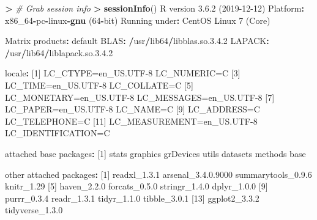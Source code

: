 \documentclass[
]{book}
\newenvironment{Shaded}{\begin{snugshade}}{\end{snugshade}}
\newcommand{\CommentTok}[1]{\textcolor[rgb]{0.56,0.35,0.01}{\textit{#1}}}
\newcommand{\DecValTok}[1]{\textcolor[rgb]{0.00,0.00,0.81}{#1}}
\newcommand{\ErrorTok}[1]{\textcolor[rgb]{0.64,0.00,0.00}{\textbf{#1}}}
\newcommand{\FloatTok}[1]{\textcolor[rgb]{0.00,0.00,0.81}{#1}}
\newcommand{\KeywordTok}[1]{\textcolor[rgb]{0.13,0.29,0.53}{\textbf{#1}}}
\newcommand{\NormalTok}[1]{#1}
\newcommand{\OperatorTok}[1]{\textcolor[rgb]{0.81,0.36,0.00}{\textbf{#1}}}
\newcommand{\StringTok}[1]{\textcolor[rgb]{0.31,0.60,0.02}{#1}}
\begin{document}
\begin{Shaded}
\begin{Highlighting}[]
\OperatorTok{>}\StringTok{ }\CommentTok{# Grab session info}
\ErrorTok{>}\StringTok{ }\KeywordTok{sessionInfo}\NormalTok{()}
\NormalTok{R version }\DecValTok{3}\NormalTok{.}\FloatTok{6.2}\NormalTok{ (}\DecValTok{2019-12-12}\NormalTok{)}
\NormalTok{Platform}\OperatorTok{:}\StringTok{ }\NormalTok{x86_}\DecValTok{64}\OperatorTok{-}\NormalTok{pc}\OperatorTok{-}\NormalTok{linux}\OperatorTok{-}\KeywordTok{gnu}\NormalTok{ (}\DecValTok{64}\OperatorTok{-}\NormalTok{bit)}
\NormalTok{Running under}\OperatorTok{:}\StringTok{ }\NormalTok{CentOS Linux }\DecValTok{7}\NormalTok{ (Core)}

\NormalTok{Matrix products}\OperatorTok{:}\StringTok{ }\NormalTok{default}
\NormalTok{BLAS}\OperatorTok{:}\StringTok{   }\ErrorTok{/}\NormalTok{usr}\OperatorTok{/}\NormalTok{lib64}\OperatorTok{/}\NormalTok{libblas.so.}\DecValTok{3}\NormalTok{.}\FloatTok{4.2}
\NormalTok{LAPACK}\OperatorTok{:}\StringTok{ }\ErrorTok{/}\NormalTok{usr}\OperatorTok{/}\NormalTok{lib64}\OperatorTok{/}\NormalTok{liblapack.so.}\DecValTok{3}\NormalTok{.}\FloatTok{4.2}

\NormalTok{locale}\OperatorTok{:}
\StringTok{ }\NormalTok{[}\DecValTok{1}\NormalTok{] LC_CTYPE=en_US.UTF}\DecValTok{-8}\NormalTok{       LC_NUMERIC=C              }
\NormalTok{ [}\DecValTok{3}\NormalTok{] LC_TIME=en_US.UTF}\DecValTok{-8}\NormalTok{        LC_COLLATE=C              }
\NormalTok{ [}\DecValTok{5}\NormalTok{] LC_MONETARY=en_US.UTF}\DecValTok{-8}\NormalTok{    LC_MESSAGES=en_US.UTF}\DecValTok{-8}   
\NormalTok{ [}\DecValTok{7}\NormalTok{] LC_PAPER=en_US.UTF}\DecValTok{-8}\NormalTok{       LC_NAME=C                 }
\NormalTok{ [}\DecValTok{9}\NormalTok{] LC_ADDRESS=C               LC_TELEPHONE=C            }
\NormalTok{[}\DecValTok{11}\NormalTok{] LC_MEASUREMENT=en_US.UTF}\DecValTok{-8}\NormalTok{ LC_IDENTIFICATION=C       }

\NormalTok{attached base packages}\OperatorTok{:}
\NormalTok{[}\DecValTok{1}\NormalTok{] stats     graphics  grDevices utils     datasets  methods   base     }

\NormalTok{other attached packages}\OperatorTok{:}
\StringTok{ }\NormalTok{[}\DecValTok{1}\NormalTok{] readxl_}\DecValTok{1}\NormalTok{.}\FloatTok{3.1}\NormalTok{       arsenal_}\DecValTok{3}\NormalTok{.}\DecValTok{4}\NormalTok{.}\FloatTok{0.9000}\NormalTok{ summarytools_}\DecValTok{0}\NormalTok{.}\FloatTok{9.6}\NormalTok{ knitr_}\FloatTok{1.29}        
\NormalTok{ [}\DecValTok{5}\NormalTok{] haven_}\DecValTok{2}\NormalTok{.}\FloatTok{2.0}\NormalTok{        forcats_}\DecValTok{0}\NormalTok{.}\FloatTok{5.0}\NormalTok{      stringr_}\DecValTok{1}\NormalTok{.}\FloatTok{4.0}\NormalTok{      dplyr_}\DecValTok{1}\NormalTok{.}\FloatTok{0.0}       
\NormalTok{ [}\DecValTok{9}\NormalTok{] purrr_}\DecValTok{0}\NormalTok{.}\FloatTok{3.4}\NormalTok{        readr_}\DecValTok{1}\NormalTok{.}\FloatTok{3.1}\NormalTok{        tidyr_}\DecValTok{1}\NormalTok{.}\FloatTok{1.0}\NormalTok{        tibble_}\DecValTok{3}\NormalTok{.}\FloatTok{0.1}      
\NormalTok{[}\DecValTok{13}\NormalTok{] ggplot2_}\DecValTok{3}\NormalTok{.}\FloatTok{3.2}\NormalTok{      tidyverse_}\DecValTok{1}\NormalTok{.}\FloatTok{3.0}   


\end{Highlighting}
\end{Shaded}
\end{document}
